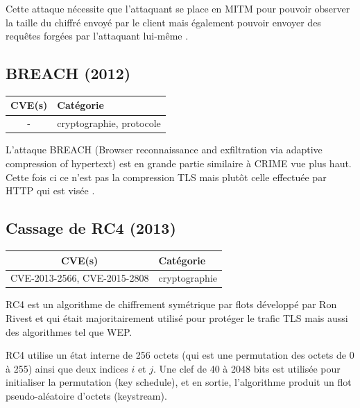 Cette attaque nécessite que l'attaquant se place en MITM pour pouvoir observer la taille du chiffré envoyé par le client mais également pouvoir envoyer des requêtes forgées par l'attaquant lui-même \cite{crime}.




\subsection{BREACH (2012)}

\begin{tabularx}{0.96\textwidth}{|c|X|}
  \hline
  \textbf{CVE(s)} & \textbf{Catégorie} \\
  \hline
  - & cryptographie, protocole \\
  \hline
\end{tabularx}

\vspace{1em}


L'attaque BREACH (Browser reconnaissance and exfiltration via adaptive compression of hypertext) est en grande partie similaire à CRIME vue plus haut. Cette fois ci ce n'est pas la compression TLS mais plutôt celle effectuée par HTTP qui est visée \cite{breach}.




\subsection{Cassage de RC4 (2013)}

\begin{tabularx}{0.96\textwidth}{|c|X|}
  \hline
  \textbf{CVE(s)} & \textbf{Catégorie} \\
  \hline
  CVE-2013-2566, CVE-2015-2808 & cryptographie \\
  \hline
\end{tabularx}

\vspace{1em}


RC4 est un algorithme de chiffrement symétrique par flots développé par Ron Rivest et qui était majoritairement utilisé pour protéger le trafic TLS mais aussi des algorithmes tel que WEP.

RC4 utilise un état interne de 256 octets (qui est une permutation des octets de 0 à 255) ainsi que deux indices $i$ et $j$. Une clef de 40 à 2048 bits est utilisée pour initialiser la permutation (key schedule), et en sortie, l'algorithme produit un flot pseudo-aléatoire d'octets (keystream).

